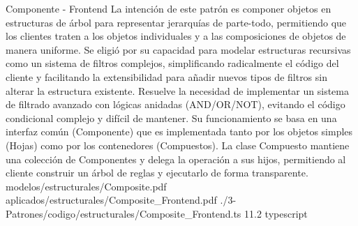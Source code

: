 
\Patron
    {Componente - Frontend}
    {La intención de este patrón es componer objetos en estructuras de árbol para representar jerarquías de parte-todo, permitiendo que los clientes traten a los objetos individuales y a las composiciones de objetos de manera uniforme. Se eligió por su capacidad para modelar estructuras recursivas como un sistema de filtros complejos, simplificando radicalmente el código del cliente y facilitando la extensibilidad para añadir nuevos tipos de filtros sin alterar la estructura existente.}
    {Resuelve la necesidad de implementar un sistema de filtrado avanzado con lógicas anidadas (AND/OR/NOT), evitando el código condicional complejo y difícil de mantener. Su funcionamiento se basa en una interfaz común (Componente) que es implementada tanto por los objetos simples (Hojas) como por los contenedores (Compuestos). La clase Compuesto mantiene una colección de Componentes y delega la operación a sus hijos, permitiendo al cliente construir un árbol de reglas y ejecutarlo de forma transparente.}
    {modelos/estructurales/Composite.pdf}
    {aplicados/estructurales/Composite_Frontend.pdf}
    {./3-Patrones/codigo/estructurales/Composite_Frontend.ts}
    {1}{1.2}
    {typescript}
\newpage

